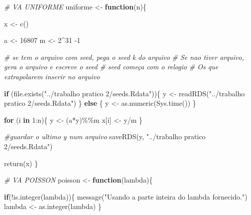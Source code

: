 \documentclass[
]{article}
\newenvironment{Shaded}{\begin{snugshade}}{\end{snugshade}}
\newcommand{\CommentTok}[1]{\textcolor[rgb]{0.56,0.35,0.01}{\textit{#1}}}
\newcommand{\ControlFlowTok}[1]{\textcolor[rgb]{0.13,0.29,0.53}{\textbf{#1}}}
\newcommand{\DecValTok}[1]{\textcolor[rgb]{0.00,0.00,0.81}{#1}}
\newcommand{\FunctionTok}[1]{\textcolor[rgb]{0.00,0.00,0.00}{#1}}
\newcommand{\NormalTok}[1]{#1}
\newcommand{\OtherTok}[1]{\textcolor[rgb]{0.56,0.35,0.01}{#1}}
\newcommand{\SpecialCharTok}[1]{\textcolor[rgb]{0.00,0.00,0.00}{#1}}
\newcommand{\StringTok}[1]{\textcolor[rgb]{0.31,0.60,0.02}{#1}}
\begin{document}
\begin{Shaded}
\begin{Highlighting}[]
\CommentTok{\# VA UNIFORME}
\NormalTok{uniforme }\OtherTok{\textless{}{-}} \ControlFlowTok{function}\NormalTok{(n)\{}
  
\NormalTok{  x }\OtherTok{\textless{}{-}} \FunctionTok{c}\NormalTok{()}
  
\NormalTok{  a }\OtherTok{\textless{}{-}} \DecValTok{16807}
\NormalTok{  m }\OtherTok{\textless{}{-}} \DecValTok{2}\SpecialCharTok{\^{}}\DecValTok{31} \SpecialCharTok{{-}}\DecValTok{1}
  
  \CommentTok{\# se tem o arquivo com seed, pega o seed k do arquivo}
  \CommentTok{\# Se nao tiver arquivo, gera o arquivo e escreve o seed}
  \CommentTok{\# seed começa com o relogio}
  \CommentTok{\# Os que extrapolarem inserir no arquivo}
  
  \ControlFlowTok{if}\NormalTok{ (}\FunctionTok{file.exists}\NormalTok{(}\StringTok{"../trabalho pratico 2/seeds.Rdata"}\NormalTok{))\{}
\NormalTok{    y }\OtherTok{\textless{}{-}} \FunctionTok{readRDS}\NormalTok{(}\StringTok{"../trabalho pratico 2/seeds.Rdata"}\NormalTok{)}
\NormalTok{  \} }\ControlFlowTok{else}\NormalTok{ \{}
\NormalTok{    y }\OtherTok{\textless{}{-}} \FunctionTok{as.numeric}\NormalTok{(}\FunctionTok{Sys.time}\NormalTok{())}
\NormalTok{  \}}
  
  \ControlFlowTok{for}\NormalTok{ (i }\ControlFlowTok{in} \DecValTok{1}\SpecialCharTok{:}\NormalTok{n)\{}
\NormalTok{    y }\OtherTok{\textless{}{-}}\NormalTok{ (a}\SpecialCharTok{*}\NormalTok{y)}\SpecialCharTok{\%\%}\NormalTok{m}
\NormalTok{    x[i] }\OtherTok{\textless{}{-}}\NormalTok{ y}\SpecialCharTok{/}\NormalTok{m}
\NormalTok{  \}}
  
  \CommentTok{\#guardar o ultimo y num arquivo}
  \FunctionTok{saveRDS}\NormalTok{(y, }\StringTok{"../trabalho pratico 2/seeds.Rdata"}\NormalTok{)}
  
  \FunctionTok{return}\NormalTok{(x)}
\NormalTok{\}}

\CommentTok{\# VA POISSON}
\NormalTok{poisson }\OtherTok{\textless{}{-}} \ControlFlowTok{function}\NormalTok{(lambda)\{}
  
  \ControlFlowTok{if}\NormalTok{(}\SpecialCharTok{!}\FunctionTok{is.integer}\NormalTok{(lambda))\{}
    \FunctionTok{message}\NormalTok{(}\StringTok{"Usando a parte inteira do lambda fornecido."}\NormalTok{)}
\NormalTok{    lambda }\OtherTok{\textless{}{-}} \FunctionTok{as.integer}\NormalTok{(lambda)}
\NormalTok{  \}}
  

\end{Highlighting}
\end{Shaded}
\end{document}
